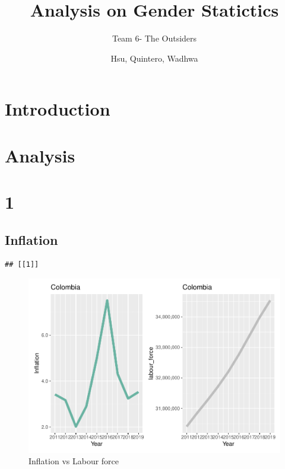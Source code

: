 \documentclass[
]{article}
\title{Analysis on Gender Statictics}
\subtitle{Team 6- The Outsiders}
\author{Hsu, Quintero, Wadhwa}
\date{}
\begin{document}
\maketitle

{
\setcounter{tocdepth}{2}
\tableofcontents
}
\hypertarget{introduction}{%
\section{Introduction}\label{introduction}}

\clearpage

\hypertarget{analysis}{%
\section{Analysis}\label{analysis}}

\section*{1}

\hypertarget{inflation}{%
\subsection{Inflation}\label{inflation}}

\begin{verbatim}
## [[1]]
\end{verbatim}

\begin{figure}
\centering
\includegraphics{The_Outsiders_5513_files/figure-latex/A1-1.pdf}
\caption{Inflation vs Labour force}
\end{figure}
\end{document}
